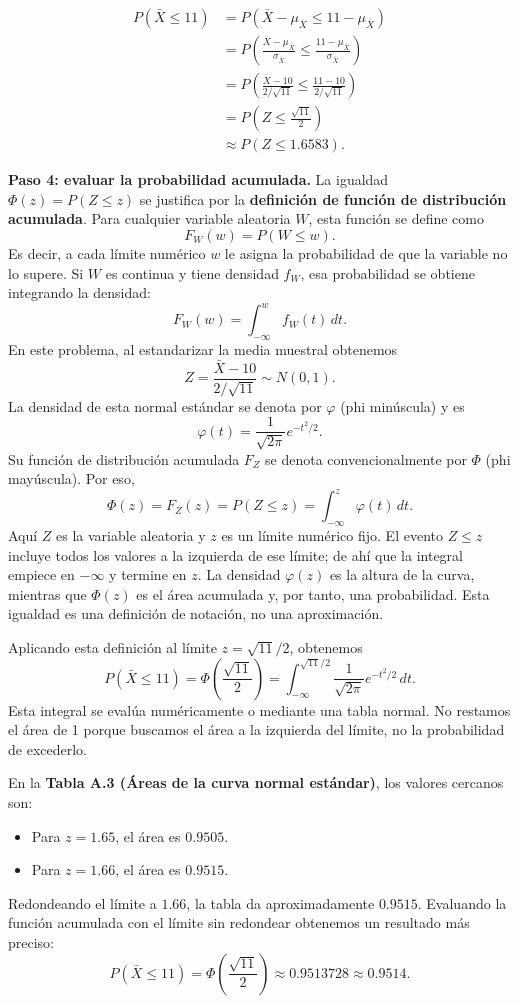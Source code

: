 \documentclass[a4paper]{article}
\begin{document}
\begin{align*}
P(\bar{X}\le 11)
&=P(\bar{X}-\mu_{\bar{X}}\le 11-\mu_{\bar{X}})\\
&=P\left(\frac{\bar{X}-\mu_{\bar{X}}}{\sigma_{\bar{X}}}
\le\frac{11-\mu_{\bar{X}}}{\sigma_{\bar{X}}}\right)\\
&=P\left(\frac{\bar{X}-10}{2/\sqrt{11}}
\le\frac{11-10}{2/\sqrt{11}}\right)\\
&=P\left(Z\le\frac{\sqrt{11}}{2}\right)\\
&\approx P(Z\le 1.6583).
\end{align*}

\textbf{Paso 4: evaluar la probabilidad acumulada.}
La igualdad $\Phi(z)=P(Z\le z)$ se justifica por la \textbf{definición de función de distribución acumulada}. Para cualquier variable aleatoria $W$, esta función se define como
\[
F_W(w)=P(W\le w).
\]
Es decir, a cada límite numérico $w$ le asigna la probabilidad de que la variable no lo supere. Si $W$ es continua y tiene densidad $f_W$, esa probabilidad se obtiene integrando la densidad:
\[
F_W(w)=\int_{-\infty}^{w}f_W(t)\,dt.
\]
En este problema, al estandarizar la media muestral obtenemos
\[
Z=\frac{\bar{X}-10}{2/\sqrt{11}}\sim N(0,1).
\]
La densidad de esta normal estándar se denota por $\varphi$ (phi minúscula) y es
\[
\varphi(t)=\frac{1}{\sqrt{2\pi}}e^{-t^2/2}.
\]
Su función de distribución acumulada $F_Z$ se denota convencionalmente por $\Phi$ (phi mayúscula). Por eso,
\[
\Phi(z)=F_Z(z)=P(Z\le z)
=\int_{-\infty}^{z}\varphi(t)\,dt.
\]
Aquí $Z$ es la variable aleatoria y $z$ es un límite numérico fijo. El evento $Z\le z$ incluye todos los valores a la izquierda de ese límite; de ahí que la integral empiece en $-\infty$ y termine en $z$. La densidad $\varphi(z)$ es la altura de la curva, mientras que $\Phi(z)$ es el área acumulada y, por tanto, una probabilidad. Esta igualdad es una definición de notación, no una aproximación.

Aplicando esta definición al límite $z=\sqrt{11}/2$, obtenemos
\[
P(\bar{X}\le 11)
=\Phi\left(\frac{\sqrt{11}}{2}\right)
=\int_{-\infty}^{\sqrt{11}/2}\frac{1}{\sqrt{2\pi}}e^{-t^2/2}\,dt.
\]
Esta integral se evalúa numéricamente o mediante una tabla normal. No restamos el área de 1 porque buscamos el área a la izquierda del límite, no la probabilidad de excederlo.

En la \textbf{Tabla A.3 (Áreas de la curva normal estándar)}, los valores cercanos son:
\begin{itemize}
    \item Para $z = 1.65$, el área es $0.9505$.
    \item Para $z = 1.66$, el área es $0.9515$.
\end{itemize}
Redondeando el límite a $1.66$, la tabla da aproximadamente $0.9515$. Evaluando la función acumulada con el límite sin redondear obtenemos un resultado más preciso:
\[
P(\bar{X}\le 11)=\Phi\left(\frac{\sqrt{11}}{2}\right)
\approx 0.9513728\approx\mathbf{0.9514}.
\]
\end{document}
